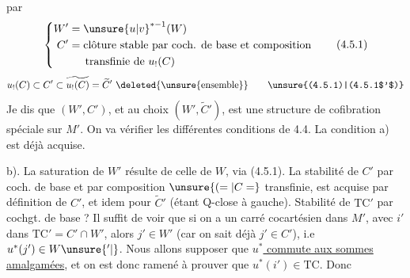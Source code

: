 
par
\[
\left\{\begin{aligned} W'&=\unsure{u|v}^{*-1}(W)\\ C'&=\text{clôture stable par coch. de base et composition}\\ &\hspace{1.5em}\text{transfinie de }u_!(C)
\end{aligned}\right.\tag*{(4.5.1)}
\]
\[
u_!(C)\subset C'\subset\widetilde{u_!(C)}=\widetilde C'\ \deleted{\unsure{\text{ensemble}}}\tag*{\unsure{(4.5.1)|(4.5.1$'$)}}
\]
Je dis que  $(W',C')$, et au choix $(W',\widetilde C')$, est une structure de cofibration spéciale sur $M'$. On va vérifier les différentes conditions de 4.4. La condition a) est déjà acquise.

b). La saturation  de $W'$ résulte de celle de $W$, via (4.5.1). La stabilité de $C'$ par coch. de base et par composition $\unsure{(=|C=}$ transfinie, est acquise par définition de $C'$, et idem pour $\widetilde C'$ (étant Q-close à gauche). Stabilité de $\mathrm{TC}'$ par cochgt. de base ? Il suffit de voir que si on a un carré cocartésien 
dans $M'$, avec $i'$ dans $\mathrm{TC}'=C'\cap W'$, alors $j'\in W'$ (car on sait déjà $j'\in C'$), i.e \margin{$\Vert$}$u^*(j')\in W\unsure{^{\prime}|{}}$. Nous allons supposer que \uline{$u^*$ commute aux sommes amalgamées}, et on est donc ramené à prouver que $u^*(i')\in\mathrm{TC}$. Donc
